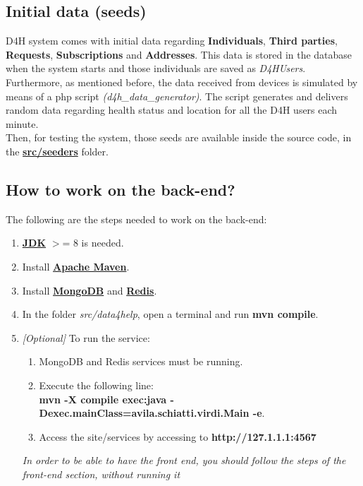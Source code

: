 \documentclass[a4paper, hidelinks, 12pt]{report}
\begin{document}
	\subsection{Initial data (seeds)}
	D4H system comes with initial data regarding \textbf{Individuals}, \textbf{Third parties}, \textbf{Requests}, \textbf{Subscriptions} and \textbf{Addresses}. This data is stored in the database when the system starts and those individuals are saved as \textit{D4HUsers}. Furthermore, as mentioned before, the data received from devices is simulated by means of a php script \textit{(d4h\_data\_generator)}. The script generates and delivers random data regarding health status and location for all the D4H users each minute.  \\
		
	Then, for testing the system, those seeds are available inside the source code, in the \href{https://github.com/lauricdd/AvilaSchiattiVirdi/tree/master/src/seeders}{\textbf{src/seeders}} folder.

	\subsection{How to work on the back-end?}
	The following are the steps needed to work on the back-end:

	\begin{enumerate}
	\item \href{https://www.oracle.com/technetwork/java/javase/downloads/index.html}{\textbf{JDK}}  $>$= 8 is needed.
	\item Install \href{https://maven.apache.org/what-is-maven.html}{\textbf{Apache Maven}}.
	\item Install \href{https://docs.mongodb.com/manual/installation/}{\textbf{MongoDB}}  and \href{https://redis.io/download}{\textbf{Redis}}.
	\item In the folder \textit{src/data4help}, open a terminal and run \textbf{mvn compile}.
	\item \textit{[Optional]} To run the service:
		\begin{enumerate}
		\item MongoDB and Redis services must be running.
		\item Execute the following line:\\
		\textbf{ mvn -X compile exec:java -Dexec.mainClass=avila.schiatti.virdi.Main -e}.
		\item Access the site/services by accessing to \textbf{http://127.1.1.1:4567}
		\end{enumerate}

	\textit{	In order to be able to have the front end, you should follow the steps of the front-end section, without running it}
	\end{enumerate}
\end{document}
